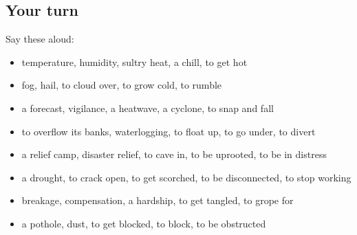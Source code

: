 \subsection*{Your turn}
Say these aloud:

\begin{itemize}
\raggedright
  \item temperature, humidity, sultry heat, a chill, to get hot
  \item fog, hail, to cloud over, to grow cold, to rumble
  \item a forecast, vigilance, a heatwave, a cyclone, to snap and fall
  \item to overflow its banks, waterlogging, to float up, to go under, to divert
  \item a relief camp, disaster relief, to cave in, to be uprooted, to be in distress
  \item a drought, to crack open, to get scorched, to be disconnected, to stop working
  \item breakage, compensation, a hardship, to get tangled, to grope for
  \item a pothole, dust, to get blocked, to block, to be obstructed
\end{itemize}

